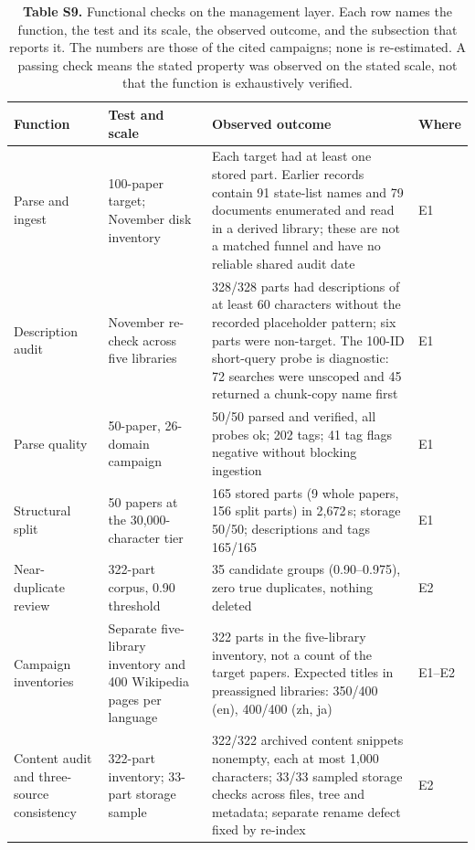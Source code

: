 \begin{table}
\centering
\footnotesize
\setlength{\tabcolsep}{4pt}
\caption{\textbf{Table S9.} Functional checks on the management layer. Each row names the
function, the test and its scale, the observed outcome, and the subsection
that reports it. The numbers are those of the cited campaigns; none is
re-estimated. A passing check means the stated property was observed on the
stated scale, not that the function is exhaustively verified.}

\begin{tabular}{@{}p{1.898cm}p{4.373cm}p{6.435cm}p{1.650cm}@{}}
\toprule
Function & Test and scale & Observed outcome & Where\\
\midrule
Parse and ingest & 100-paper target; November disk inventory & Each target had at least one stored part. Earlier records contain 91 state-list names and 79 documents enumerated and read in a derived library; these are not a matched funnel and have no reliable shared audit date & E1\\
Description audit & November re-check across five libraries & 328/328 parts had descriptions of at least 60 characters without the recorded placeholder pattern; six parts were non-target. The 100-ID short-query probe is diagnostic: 72 searches were unscoped and 45 returned a chunk-copy name first & E1\\
Parse quality & 50-paper, 26-domain campaign & 50/50 parsed and verified, all probes ok; 202 tags; 41 tag flags negative without blocking ingestion & E1\\
Structural split & 50 papers at the 30{,}000-character tier & 165 stored parts (9 whole papers, 156 split parts) in 2{,}672\,s; storage 50/50; descriptions and tags 165/165 & E1\\
Near-duplicate review & 322-part corpus, 0.90 threshold & 35 candidate groups (0.90--0.975), zero true duplicates, nothing deleted & E2\\
Campaign inventories & Separate five-library inventory and 400 Wikipedia pages per language & 322 parts in the five-library inventory, not a count of the target papers. Expected titles in preassigned libraries: 350/400 (en), 400/400 (zh, ja) & E1--E2\\
Content audit and three-source consistency & 322-part inventory; 33-part storage sample & 322/322 archived content snippets nonempty, each at most 1,000 characters; 33/33 sampled storage checks across files, tree and metadata; separate rename defect fixed by re-index & E2\\

\end{tabular}
\end{table}
